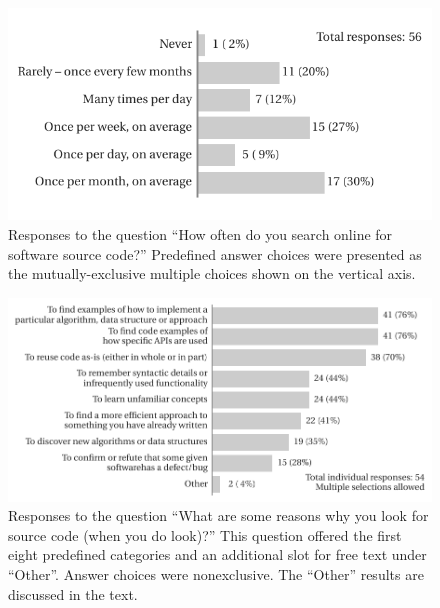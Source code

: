 \documentclass{casicswhitepaper}
\begin{document}
\begin{figure}[bht]
  \vspace*{-2ex}
  \centering
  \hspace*{15pt}\includegraphics{files/plots/bar-graph-how-often-src.pdf}
  \vspace*{-3ex}
  \caption{Responses to the question  ``How often do you search online for software source code?''  Predefined answer choices were presented as the mutually-exclusive multiple choices shown on the vertical axis.}
  \label{how-often-search-for-src}
\end{figure}

\begin{figure}[hb]
  \vspace*{-3ex}
  \centering
  \includegraphics{files/plots/bar-graph-why-search-for-src.pdf}
  \vspace*{-2ex}
  \caption{Responses to the question ``What are some reasons why you look for source code (when you do look)?''  This question offered the first eight predefined categories and an additional slot for free text under ``Other''.  Answer choices were nonexclusive.  The ``Other'' results are discussed in the text.}
  \label{why-search-for-src}
\end{figure}
\end{document}
